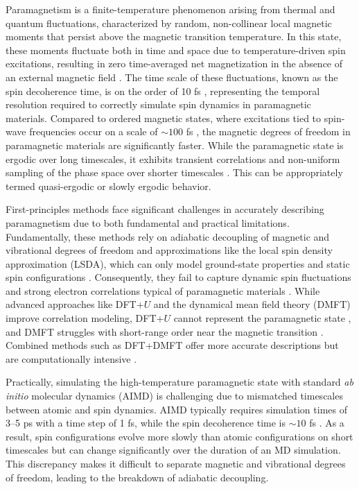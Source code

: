 \documentclass[preprint, 12pt]{elsarticle}
\newcommand{\?}{\stackrel{?}{=}}
\begin{document}
Paramagnetism is a finite-temperature phenomenon arising from thermal and quantum fluctuations, characterized by random, non-collinear local magnetic moments that persist above the magnetic transition temperature. In this state, these moments fluctuate both in time and space due to temperature-driven spin excitations, resulting in zero time-averaged net magnetization in the absence of an external magnetic field \cite{Abrikosov2016}. The time scale of these fluctuations, known as the spin decoherence time, is on the order of 10 fs \cite{Steneteg2012}, representing the temporal resolution required to correctly simulate spin dynamics in paramagnetic materials. Compared to ordered magnetic states, where excitations tied to spin-wave frequencies occur on a scale of $\sim 100$ fs \cite{Abrikosov2016}, the magnetic degrees of freedom in paramagnetic materials are significantly faster. While the paramagnetic state is ergodic over long timescales, it exhibits transient correlations and non-uniform sampling of the phase space over shorter timescales \cite{Gyorffy1985, Abrikosov2016}. This can be appropriately termed quasi-ergodic or slowly ergodic behavior.

First-principles methods face significant challenges in accurately describing paramagnetism due to both fundamental and practical limitations. Fundamentally, these methods rely on adiabatic decoupling of magnetic and vibrational degrees of freedom \cite{Abrikosov2016} and approximations like the local spin density approximation (LSDA), which can only model ground-state properties and static spin configurations \cite{Giustino2014}. Consequently, they fail to capture dynamic spin fluctuations and strong electron correlations typical of paramagnetic materials \cite{Kotliar2004}. While advanced approaches like DFT+$U$ and the dynamical mean field theory (DMFT) improve correlation modeling, DFT+$U$ cannot represent the paramagnetic state \cite{Liu2019, Shousha2024}, and DMFT struggles with short-range order near the magnetic transition \cite{Abrikosov2016}. Combined methods such as DFT+DMFT offer more accurate descriptions but are computationally intensive \cite{Kotliar2004, Steneteg2012}.

Practically, simulating the high-temperature paramagnetic state with standard \textit{ab initio} molecular dynamics (AIMD) is challenging due to mismatched timescales between atomic and spin dynamics. AIMD typically requires simulation times of 3--5 ps with a time step of 1 fs, while the spin decoherence time is $\sim 10$ fs \cite{Steneteg2012, Abrikosov2016}. As a result, spin configurations evolve more slowly than atomic configurations on short timescales but can change significantly over the duration of an MD simulation. This discrepancy makes it difficult to separate magnetic and vibrational degrees of freedom, leading to the breakdown of adiabatic decoupling.
\end{document}
